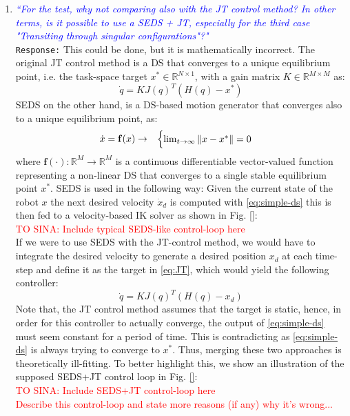 \documentclass{article}
\begin{document}
\begin{enumerate}
\item \textcolor{blue}{\textit{``For the test, why not comparing also with the JT control method? In
other terms, is it possible to use a SEDS + JT, especially for the
third case "Transiting through singular configurations"?"}}\\
\texttt{Response:} \small This could be done, but it is mathematically incorrect. The original JT control method is a DS that converges to a unique equilibrium point, i.e. the task-space target $x^*\in \mathbb{R}^{N\times 1}$, with a gain matrix $K \in \mathbb{R}^{M\times M}$ as:\begin{equation}
\dot{q} = K J(q)^T(H(q)- x^*) 
\label{eq:JT}
\end{equation}
SEDS on the other hand, is a DS-based motion generator that converges also to a unique equilibrium point, as:
\begin{equation}
\hfill \begin{aligned}
&  \dot{x}  = \mathbf{f}(x)
\rightarrow  &
\begin{cases}
\lim_{t \rightarrow \infty}\|x - x^*\|=0
\end{cases}
\end{aligned}  \hfill
\label{eq:simple-ds}
\end{equation}
where $\mathbf{f}(\cdot): \mathbb{R}^M \rightarrow \mathbb{R}^M$ is a continuous differentiable vector-valued function representing a non-linear DS that converges to a single stable equilibrium point $x^*$. SEDS is used in the following way: Given the current state of the robot $x$ the next desired velocity $\dot{x}_d$ is computed with \eqref{eq:simple-ds} this is then fed to a velocity-based IK solver as shown in Fig. \ref{}:\\
\textcolor{red}{TO SINA: Include typical SEDS-like control-loop here}\\
If we were to use SEDS with the JT-control method, we would have to integrate the desired velocity to generate a desired position $x_d$ at each time-step and define it as the target in \eqref{eq:JT}, which would yield the following controller:
\begin{equation}
\dot{q} = K J(q)^T(H(q)- x_d) 
\end{equation} Note that, the JT control method assumes that the target is static, hence, in order for this controller to actually converge, the output of \eqref{eq:simple-ds} must seem constant for a period of time. This is contradicting as \eqref{eq:simple-ds} is always trying to converge to $x^*$. Thus, merging these two approaches is theoretically ill-fitting. To better highlight this, we show an illustration of the supposed SEDS+JT control loop in Fig. \ref{}:\\
\textcolor{red}{TO SINA: Include SEDS+JT control-loop here}\\
\textcolor{red}{\small Describe this control-loop and state more reasons (if any) why it's wrong...}


\end{enumerate}
\end{document}
